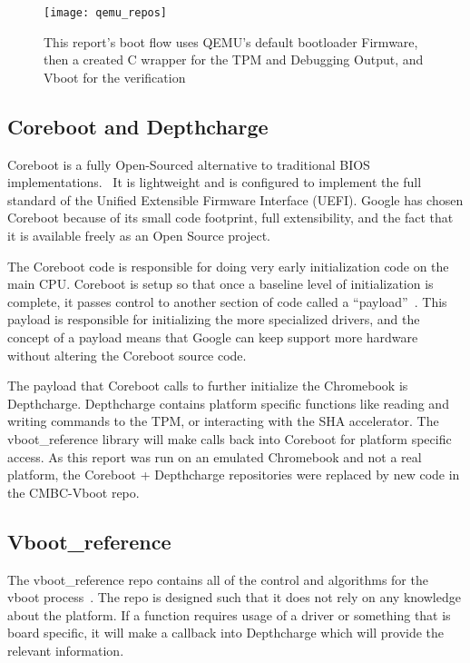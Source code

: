 \begin{figure}
  \centering
  \texttt{[image: qemu\_repos]}
  \caption[This report's Repository Layout]{This report's boot flow uses QEMU's default bootloader Firmware, then
  a created C wrapper for the TPM and Debugging Output, and Vboot for the
  verification}\label{fig:qemu_repos}
\end{figure}

\subsection{Coreboot and Depthcharge}\label{coreboot}

Coreboot is a fully Open-Sourced alternative to traditional BIOS implementations.~\cite{coreboot}
It is lightweight and is configured to implement the full standard of the Unified Extensible Firmware Interface (UEFI).
Google has chosen Coreboot because of its small code footprint, full extensibility, and the fact that it is available freely as an Open Source project.

The Coreboot code is responsible for doing very early initialization code on the main CPU\@. 
Coreboot is setup so that once a baseline level of initialization is complete, it passes control to another section of code called a ``payload''~\cite{coreboot-payload}.
This payload is responsible for initializing the more specialized drivers, and the concept of a payload means that Google can keep support more hardware without altering the Coreboot source code.

The payload that Coreboot calls to further initialize the Chromebook is Depthcharge.
Depthcharge contains platform specific functions like reading and writing
commands to the TPM, or interacting with the SHA accelerator. 
The vboot\_reference library will make calls back into Coreboot for platform
specific access. 
As this report was run on an emulated Chromebook and not a real platform, the
Coreboot + Depthcharge repositories were replaced by new code in the CMBC-Vboot
repo.

\subsection{Vboot\_reference}

The vboot\_reference repo contains all of the control and algorithms for the vboot process~\cite{vboot-codebase}.
The repo is designed such that it does not rely on any knowledge about the platform.
If a function requires usage of a driver or something that is board specific, it will make a callback into Depthcharge which will provide the relevant information.

